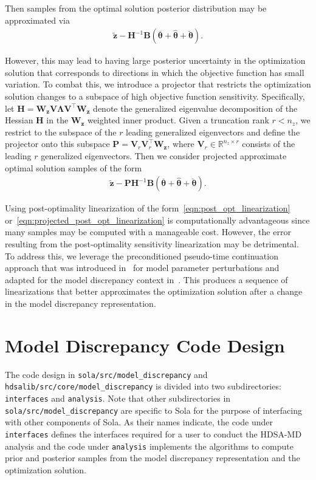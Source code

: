 \documentclass[11pt]{article}
\renewcommand{\vec}[1] {\boldsymbol{#1}}
\newcommand{\R}{\mathbb{R}}
\renewcommand{\t}{\bm{\theta}}
\newcommand{\z}{\bm{z}}
\newcommand{\0}{\bm{0}}
\renewcommand{\H}{\bm{H}}
\newcommand{\B}{\bm{B}}
\newcommand{\W}{\bm{W}}
\newcommand{\ztilde}{\tilde{\z}}
\begin{document}
Then samples from the optimal solution posterior distribution may be approximated via
\begin{align} \label{eqn:post_opt_linearization}
\ztilde - \H^{-1} \B (\overline{\t} + \hat{\t} + \breve{\t}).
\end{align}

However, this may lead to having large posterior uncertainty in the optimization solution that corresponds to directions in which the objective function has small variation. To combat this, we introduce a projector that restricts the optimization solution changes to a subspace of high objective function sensitivity. Specifically, let $\H = \W_{\z} \vec{V} \vec{\Lambda} \vec{V}^\top \W_{\z}$ denote the generalized eigenvalue decomposition of the Hessian $\H$ in the $\W_{\z}$ weighted inner product. Given a truncation rank $r < n_z$, we restrict to the subspace of the $r$ leading generalized eigenvectors and define the projector onto this subspace $\vec{P} = \vec{V}_{r} \vec{V}_{r}^\top \W_{\z}$, where $\vec{V}_{r} \in \R^{n_z \times r}$ consists of the leading $r$ generalized eigenvectors. Then we consider projected approximate optimal solution samples of the form
\begin{align} \label{eqn:projected_post_opt_linearization}
\ztilde - \vec{P} \H^{-1} \B (\overline{\t} + \hat{\t} + \breve{\t}).
\end{align}

Using post-optimality linearization of the form~\eqref{eqn:post_opt_linearization} or~\eqref{eqn:projected_post_opt_linearization} is computationally advantageous since many samples may be computed with a manageable cost. However, the error resulting from the post-optimality sensitivity linearization may be detrimental. To address this, we leverage the preconditioned pseudo-time continuation approach that was introduced in~\cite{hart2026ptc} for model parameter perturbations and adapted for the model discrepancy context in~\cite{madhavan2026}. This produces a sequence of linearizations that better approximates the optimization solution after a change in the model discrepancy representation.

\section*{Model Discrepancy Code Design}

The code design in \texttt{sola/src/model\_discrepancy} and \texttt{hdsalib/src/core/model\_discrepancy} is divided into two subdirectories: \texttt{interfaces} and \texttt{analysis}. Note that other subdirectories in \texttt{sola/src/model\_discrepancy} are specific to Sola for the purpose of interfacing with other components of Sola. As their names indicate, the code under \texttt{interfaces} defines the interfaces required for a user to conduct the HDSA-MD analysis and the code under \texttt{analysis} implements the algorithms to compute prior and posterior samples from the model discrepancy representation and the optimization solution. 
\end{document}
